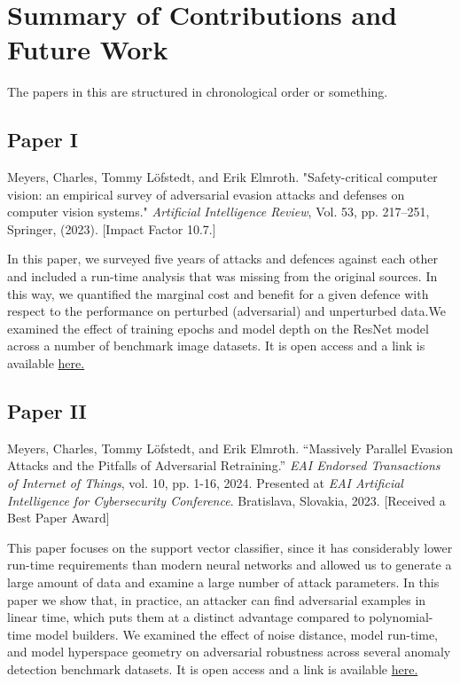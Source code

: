 \chapter{Summary of Contributions and Future Work}
The papers in this are structured in chronological order or something.
\section{Paper I}
Meyers, Charles, Tommy Löfstedt, and Erik Elmroth. "Safety-critical computer vision: an empirical survey of adversarial evasion attacks and defenses on computer vision systems." {\em Artificial Intelligence Review}, Vol. 53, pp. 217--251, Springer, (2023). [Impact Factor 10.7.]

In this paper, we surveyed five years of attacks and defences against each other and included a run-time analysis that was missing from the original sources. In this way, we quantified the marginal cost and benefit for a given defence with respect to the performance on perturbed (adversarial) and unperturbed data.We examined the effect of training epochs and model depth on the ResNet model across a number of benchmark image datasets. It is open access and a link is available  \href{https://link.springer.com/article/10.1007/s10462-023-10521-4}{here.} 
\section{Paper II}
Meyers, Charles, Tommy Löfstedt, and Erik Elmroth. “Massively Parallel Evasion Attacks and the Pitfalls of Adversarial Retraining.” {\em EAI Endorsed Transactions of Internet of Things}, vol. 10, pp. 1-16,  2024.
Presented at {\em EAI Artificial Intelligence for Cybersecurity Conference}. Bratislava, Slovakia, 2023. [Received a Best Paper Award]

This paper focuses on the support vector classifier, since it has considerably lower run-time requirements than modern neural networks and allowed us to generate a large amount of data and examine a large number of attack parameters. In this paper we show that, in practice, an attacker can find adversarial examples in linear time, which puts them at a distinct advantage compared to polynomial-time model builders. We examined the effect of noise distance, model run-time, and model hyperspace geometry on adversarial robustness across several anomaly detection benchmark datasets. It is open access and a link is available \href{https://publications.eai.eu/index.php/IoT/article/view/6652}{here.}


